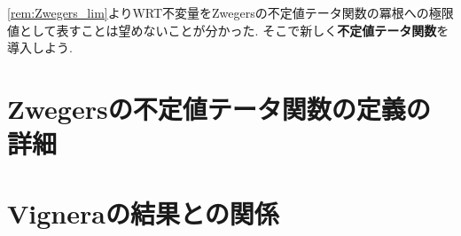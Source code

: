 \documentclass[11pt,b5paper,oneside,lualatex]{ltjsarticle} %
\numberwithin{equation}{section} %
\begin{document}
\cref{rem:Zwegers_lim}よりWRT不変量をZwegersの不定値テータ関数の冪根への極限値として表すことは望めないことが分かった. 
そこで新しく\textbf{不定値テータ関数}を導入しよう. 


\section{Zwegersの不定値テータ関数の定義の詳細} \label{sec:dfn}





\subsection{} \label{subsec:}










\subsection{} \label{subsec:}














\section{Vigneraの結果との関係} \label{sec:}

\end{document}
